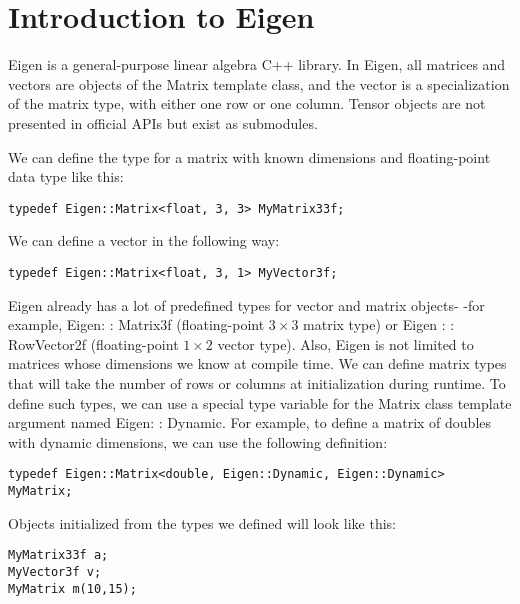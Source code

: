 \documentclass[12pt]{article}
\begin{document}
\section{Introduction to Eigen}

Eigen is a general-purpose linear algebra C++ library. In Eigen, all matrices and vectors are objects of the Matrix template class, and the vector is a specialization of the matrix type, with either one row or one column. Tensor objects are not presented in official APIs but exist as submodules.

We can define the type for a matrix with known dimensions and floating-point data type like this:

\begin{verbatim}
typedef Eigen::Matrix<float, 3, 3> MyMatrix33f;
\end{verbatim}

We can define a vector in the following way:

\begin{verbatim}
typedef Eigen::Matrix<float, 3, 1> MyVector3f;
\end{verbatim}

Eigen already has a lot of predefined types for vector and matrix objects- -for example, Eigen: : Matrix3f (floating-point $3 \times 3$ matrix type) or Eigen : : RowVector2f (floating-point $1 \times 2$ vector type). Also, Eigen is not limited to matrices whose dimensions we know at compile time. We can define matrix types that will take the number of rows or columns at initialization during runtime. To define such types, we can use a special type variable for the Matrix class template argument named Eigen: : Dynamic. For example, to define a matrix of doubles with dynamic dimensions, we can use the following definition:

\begin{verbatim}
typedef Eigen::Matrix<double, Eigen::Dynamic, Eigen::Dynamic> MyMatrix;
\end{verbatim}

Objects initialized from the types we defined will look like this:

\begin{verbatim}
MyMatrix33f a; 
MyVector3f v;
MyMatrix m(10,15);
\end{verbatim}
\end{document}
